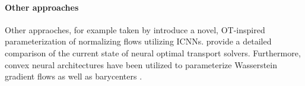 \paragraph{Other approaches}
Other appraoches, for example taken by \citet{huang2021} introduce a novel, OT-inspired parameterization of normalizing flows utilizing ICNNs.
\citet{korotin2020} provide a detailed comparison of the current state of neural optimal transport solvers.
Furthermore, convex neural architectures have been utilized to parameterize Wasserstein gradient flows
\citep{bunne2022, alvarez-melis2022, mokrov2021} as well as barycenters \citep{fan2021}.

